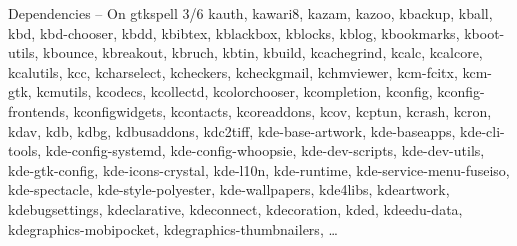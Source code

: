 \documentclass{beamer}
\begin{document}
\begin{frame}{Dependencies – On gtkspell 3/6}
kauth, kawari8, kazam, kazoo, kbackup, kball, kbd, kbd-chooser, kbdd, kbibtex, kblackbox, kblocks, kblog, kbookmarks, kboot-utils, kbounce, kbreakout, kbruch, kbtin, kbuild, kcachegrind, kcalc, kcalcore, kcalutils, kcc, kcharselect, kcheckers, kcheckgmail, kchmviewer, kcm-fcitx, kcm-gtk, kcmutils, kcodecs, kcollectd, kcolorchooser, kcompletion, kconfig, kconfig-frontends, kconfigwidgets, kcontacts, kcoreaddons, kcov, kcptun, kcrash, kcron, kdav, kdb, kdbg, kdbusaddons, kdc2tiff, kde-base-artwork, kde-baseapps, kde-cli-tools, kde-config-systemd, kde-config-whoopsie, kde-dev-scripts, kde-dev-utils, kde-gtk-config, kde-icons-crystal, kde-l10n, kde-runtime, kde-service-menu-fuseiso, kde-spectacle, kde-style-polyester, kde-wallpapers, kde4libs, kdeartwork, kdebugsettings, kdeclarative, kdeconnect, kdecoration, kded, kdeedu-data, kdegraphics-mobipocket, kdegraphics-thumbnailers, …
\end{frame}
\end{document}
